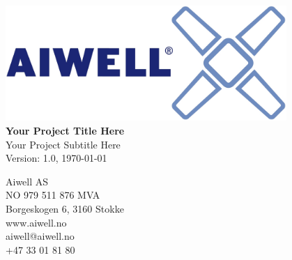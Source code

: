 \begin{titlepage}
    \centering
    \vspace*{0.5\fill} %
    \includegraphics[width=0.8\textwidth]{src/images/logo.jpg}
    \vspace{1cm}
    \\ %
    {\Huge\bfseries Your Project Title Here}\\[1cm] %
    {\Large Your Project Subtitle Here}\\[0.5cm] %
    Version: 1.0, \today %
    
    \vfill

    \begin{adjustwidth}{0cm}{0cm} %
        \begin{flushleft}
            {\small
            Aiwell AS \\
            NO 979 511 876 MVA \\
            Borgeskogen 6, 3160 Stokke \\
            www.aiwell.no \\
            aiwell@aiwell.no \\
            +47 33 01 81 80
            }
        \end{flushleft}        
    \end{adjustwidth}
\end{titlepage}
\newpage